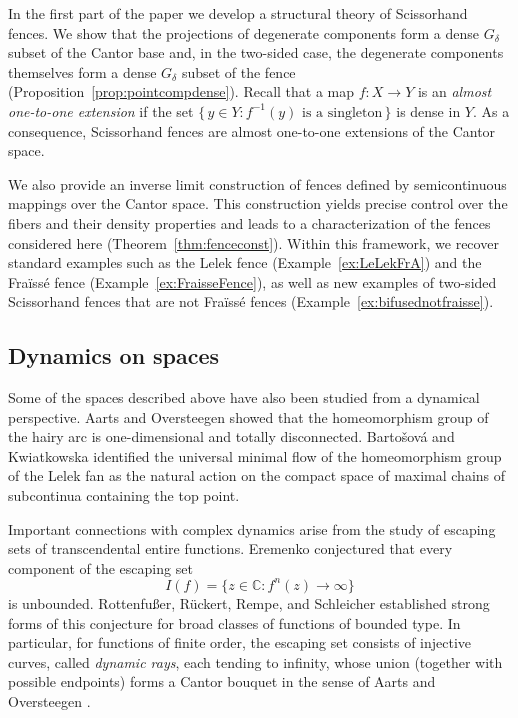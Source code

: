 \documentclass[11pt]{amsart}
\begin{document}
In the first part of the paper we develop a structural theory of Scissorhand fences. We show that the projections of degenerate components form a dense \(G_\delta\) subset of the Cantor base and, in the two-sided case, the degenerate components themselves form a dense \(G_\delta\) subset of the fence (Proposition~\ref{prop:pointcompdense}). Recall that a map \(f:X\to Y\) is an \emph{almost one-to-one extension} if the set \(\{\, y\in Y : f^{-1}(y)\text{ is a singleton} \,\}\) is dense in \(Y\). As a consequence, Scissorhand fences are almost one-to-one extensions of the Cantor space.

We also provide an inverse limit construction of fences defined by semicontinuous mappings over the Cantor space. This construction yields precise control over the fibers and their density properties and leads to a characterization of the fences considered here (Theorem~\ref{thm:fenceconst}). Within this framework, we recover standard examples such as the Lelek fence (Example~\ref{ex:LeLekFrA}) and the Fra\"iss\'e fence (Example~\ref{ex:FraisseFence}), as well as new examples of two-sided Scissorhand fences that are not Fra\"iss\'e fences (Example~\ref{ex:bifusednotfraisse}).

\subsection{Dynamics on spaces}

Some of the spaces described above have also been studied from a dynamical perspective. Aarts and Oversteegen \cite{AartsOversteegen95} showed that the homeomorphism group of the hairy arc is one-dimensional and totally disconnected. Barto\v{s}ov\'a and Kwiatkowska \cite{BartosovaKwiatkowska2015} identified the universal minimal flow of the homeomorphism group of the Lelek fan as the natural action on the compact space of maximal chains of subcontinua containing the top point.

Important connections with complex dynamics arise from the study of escaping sets of transcendental entire functions. Eremenko \cite{Eremenko1989} conjectured that every component of the escaping set
\[
I(f)=\{z\in\mathbb C : f^n(z)\to\infty\}
\]
is unbounded. Rottenfußer, Rückert, Rempe, and Schleicher \cite{RottenfusserRuckertRempeSchleicher} established strong forms of this conjecture for broad classes of functions of bounded type. In particular, for functions of finite order, the escaping set consists of injective curves, called \emph{dynamic rays}, each tending to infinity, whose union (together with possible endpoints) forms a Cantor bouquet in the sense of Aarts and Oversteegen \cite{AO93}. 
\end{document}
